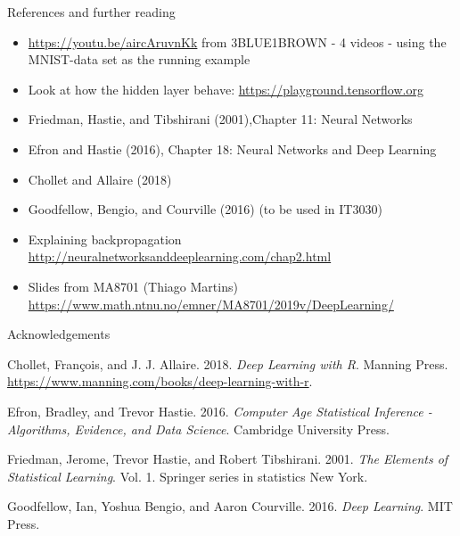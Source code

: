 \documentclass[10pt,ignorenonframetext,]{beamer}
\providecommand{\tightlist}{%
  \setlength{\itemsep}{0pt}\setlength{\parskip}{0pt}}
\begin{document}
\begin{frame}{References and further reading}
\protect\hypertarget{references-and-further-reading}{}

\begin{itemize}
\tightlist
\item
  \url{https://youtu.be/aircAruvnKk} from 3BLUE1BROWN - 4 videos - using
  the MNIST-data set as the running example
\item
  Look at how the hidden layer behave:
  \url{https://playground.tensorflow.org}
\item
  Friedman, Hastie, and Tibshirani (2001),Chapter 11: Neural Networks
\item
  Efron and Hastie (2016), Chapter 18: Neural Networks and Deep Learning
\item
  Chollet and Allaire (2018)
\item
  Goodfellow, Bengio, and Courville (2016) (to be used in IT3030)
\item
  Explaining backpropagation
  \url{http://neuralnetworksanddeeplearning.com/chap2.html}
\item
  Slides from MA8701 (Thiago Martins)
  \url{https://www.math.ntnu.no/emner/MA8701/2019v/DeepLearning/}
\end{itemize}

\end{frame}

\begin{frame}{Acknowledgements}
\protect\hypertarget{acknowledgements-1}{}

\hypertarget{refs}{}
\leavevmode\hypertarget{ref-kerasR}{}%
Chollet, François, and J. J. Allaire. 2018. \emph{Deep Learning with R}.
Manning Press. \url{https://www.manning.com/books/deep-learning-with-r}.

\leavevmode\hypertarget{ref-casi}{}%
Efron, Bradley, and Trevor Hastie. 2016. \emph{Computer Age Statistical
Inference - Algorithms, Evidence, and Data Science}. Cambridge
University Press.

\leavevmode\hypertarget{ref-ESL}{}%
Friedman, Jerome, Trevor Hastie, and Robert Tibshirani. 2001. \emph{The
Elements of Statistical Learning}. Vol. 1. Springer series in statistics
New York.

\leavevmode\hypertarget{ref-goodfellow}{}%
Goodfellow, Ian, Yoshua Bengio, and Aaron Courville. 2016. \emph{Deep
Learning}. MIT Press.

\end{frame}
\end{document}
